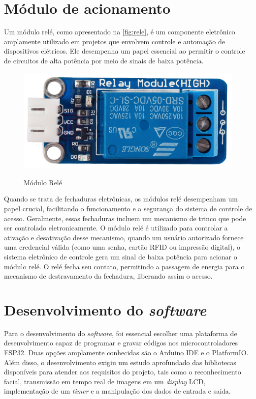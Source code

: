 \section{Módulo de acionamento}\label{sec:acionamento}

Um módulo relé, como apresentado na \autoref{fig:rele}, é um componente 
eletrônico amplamente utilizado em projetos que envolvem controle 
e automação de dispositivos elétricos. Ele desempenha 
um papel essencial ao permitir o controle de circuitos 
de alta potência por meio de sinais de baixa potência.

\begin{figure}[h!]
    \centering
    \caption{Módulo Relé}
    \includegraphics[scale=0.8]{figuras/rele.png}
    \label{fig:rele}
    \centering
\end{figure}

Quando se trata de fechaduras eletrônicas, os módulos relé desempenham um 
papel crucial, facilitando o funcionamento e a segurança do sistema de 
controle de acesso. Geralmente, essas fechaduras 
incluem um mecanismo de trinco que pode ser controlado eletronicamente. 
O módulo relé é utilizado para controlar a ativação e desativação 
desse mecanismo, quando um usuário autorizado fornece uma credencial 
válida (como uma senha, cartão RFID ou impressão digital), o sistema 
eletrônico de controle gera um sinal de baixa potência para acionar 
o módulo relé. O relé fecha seu contato, permitindo a passagem de 
energia para o mecanismo de destravamento da fechadura, liberando 
assim o acesso.

\section{Desenvolvimento do \textit{software}}\label{sec:software}

Para o desenvolvimento do \textit{software}, foi essencial escolher uma plataforma 
de desenvolvimento capaz de programar e gravar códigos nos microcontroladores 
ESP32. Duas opções amplamente conhecidas são o Arduino IDE e o PlatformIO. 
Além disso, o desenvolvimento exigiu um estudo aprofundado das 
bibliotecas disponíveis para atender aos requisitos do projeto, 
tais como o reconhecimento facial, transmissão em tempo real de 
imagens em um \textit{display} LCD, implementação de um \textit{timer} e a manipulação 
dos dados de entrada e saída.

